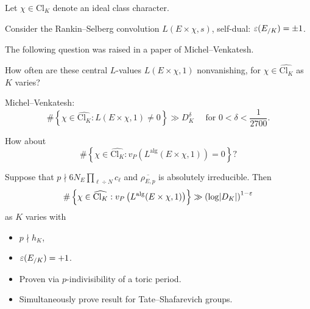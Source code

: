 \documentclass[reqno]{amsart} 
\begin{document}
Let $\chi \in \mathrm{Cl}_K$ denote an ideal class character.

Consider the Rankin--Selberg convolution $L(E \times \chi, s)$, self-dual: $\varepsilon(E_{/K}) = \pm 1$.

The following question was raised in a paper of Michel--Venkatesh.
\begin{question}\label{question:cnfg5j6lyt}
  How often are these central $L$-values $L(E \times \chi, 1)$ nonvanishing, for $\chi \in \widehat{\mathrm{Cl}_K}$ as $K$ varies?
\end{question}

Michel--Venkatesh:
\begin{equation*}
  \# \left\{ \chi \in \widehat{\mathrm{Cl}_K}
    :
    L(E \times \chi, 1) \neq 0
  \right\}
  \gg D_K^\delta \quad \text{ for } 0 < \delta < \frac{1}{2700}.
\end{equation*}

\begin{question}\label{question:cnfg5j6qpg}
  How about
\begin{equation*}
  \# \left\{ \chi \in \widehat{\mathrm{Cl}_K} : v_P \left( L^{\mathrm{alg}}(E \times \chi, 1) \right) = 0 \right\}?
\end{equation*}
\end{question}
\begin{theorem}\label{theorem:cnfg5jyk55}
  Suppose that $p \nmid 6 N_E \prod_{\ell \div N} c_{\ell}$ and $\overline{\rho_{E, p}}$ is absolutely irreducible.  Then
  \begin{equation*}
    \# \left\{ \chi \in \widehat{\mathrm{Cl}_K} : v_P \left( L^{\mathrm{alg}}(E \times \chi, 1) \right) \right\}
    \gg \left( \log \lvert D_K \rvert \right)^{1 - \varepsilon}
  \end{equation*}
  as $K$ varies with
  \begin{itemize}
  \item $p \nmid h_K$,
  \item $\varepsilon(E_{/K}) = +1$.
  \end{itemize}
\end{theorem}

\begin{remark}\label{remark:cnfg5j6ys8}
  \begin{itemize}
  \item Proven via $p$-indivisibility of a toric period.
  \item Simultaneously prove result for Tate--Shafarevich groups.
  \end{itemize}
\end{remark}
\end{document}
